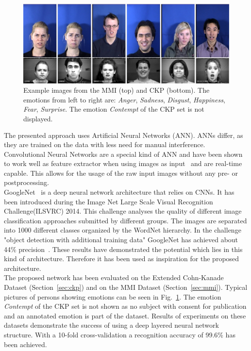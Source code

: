 \begin{figure}
   \centering
        \includegraphics[width=\columnwidth]{Fig1}
   \caption{Example images from the MMI (top) and CKP (bottom). The emotions from left to right are: \textit{Anger}, \textit{Sadness}, \textit{Disgust}, \textit{Happiness}, \textit{Fear}, \textit{Surprise}. The emotion \textit{Contempt} of the CKP set is not displayed.}\label{fig:example_images}
\end{figure}




The presented approach uses Artificial Neural Networks (ANN). ANNs differ, as they are trained on the data with less need for manual interference. 
Convolutional Neural Networks are a special kind of ANN and have been shown to work well as feature extractor when using images as input~\cite{donahue2013decaf} and are real-time capable. This allows for the usage of the raw input images without any pre- or postprocessing.\\
GoogleNet~\cite{DBLP:journals/corr/SzegedyLJSRAEVR14} is a deep neural network architecture that relies on CNNs. It has been introduced during the Image Net Large Scale Visual Recognition Challenge(ILSVRC) 2014. This challenge analyses the quality of different image classification approaches submitted by different groups. The images are separated into 1000 different classes organized by the WordNet hierarchy. In the challenge "object detection with additional training data" GoogleNet has achieved about 44\% precision~\cite{LSVRC-results}. These results have demonstrated the potential which lies in this kind of architecture. Therefore it has been used as inspiration for the proposed architecture.\\
The proposed network has been evaluated on the Extended Cohn-Kanade Dataset (Section~\ref{sec:ckp}) and on the MMI Dataset (Section~\ref{sec:mmi}). Typical pictures of persons showing emotions can be seen in Fig.~\ref{fig:example_images}.
The emotion \textit{Contempt} of the CKP set is not shown as no subject with consent for publication and an annotated emotion is part of the dataset. Results of experiments on these datasets demonstrate the success of using a deep layered neural network structure. With a 10-fold cross-validation a recognition accuracy of 99.6\% has been achieved. \\

